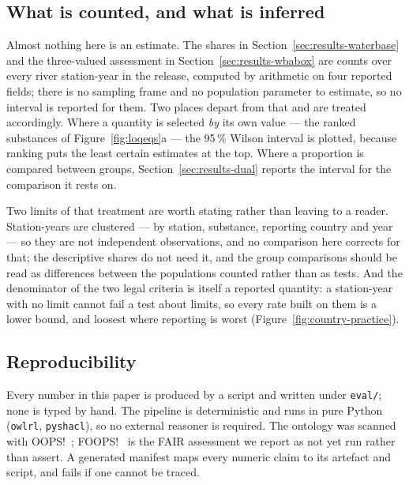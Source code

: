 \subsection{What is counted, and what is inferred}
\label{sec:methods-inference}
Almost nothing here is an estimate. The shares in
Section~\ref{sec:results-waterbase} and the three-valued assessment in
Section~\ref{sec:results-wbabox} are counts over every river station-year in the
release, computed by arithmetic on four reported fields; there is no sampling
frame and no population parameter to estimate, so no interval is reported for
them. Two places depart from that and are treated accordingly. Where a quantity
is selected \emph{by} its own value --- the ranked substances of
Figure~\ref{fig:loqeqs}a --- the \num{95}\,\% Wilson interval is plotted,
because ranking puts the least certain estimates at the top. Where a proportion
is compared between groups, Section~\ref{sec:results-dual} reports the interval
for the comparison it rests on.

Two limits of that treatment are worth stating rather than leaving to a reader.
Station-years are clustered --- by station, substance, reporting country and year
--- so they are not independent observations, and no comparison here corrects for
that; the descriptive shares do not need it, and the group comparisons should be
read as differences between the populations counted rather than as tests. And the
denominator of the two legal criteria is itself a reported quantity: a
station-year with no limit cannot fail a test about limits, so every rate built
on them is a lower bound, and loosest where reporting is worst
(Figure~\ref{fig:country-practice}).

\subsection{Reproducibility}
\label{sec:methods-repro}
Every number in this paper is produced by a script and written under
\texttt{eval/}; none is typed by hand. The pipeline is deterministic and runs in
pure Python (\texttt{owlrl}, \texttt{pyshacl}), so no external reasoner is
required. The ontology was scanned with OOPS!~\cite{poveda2014oops};
FOOPS!\ \cite{garijo2021foops} is the FAIR assessment we report as not yet run
rather than assert. A generated manifest maps every numeric claim to its
artefact and script, and fails if one cannot be
traced.

